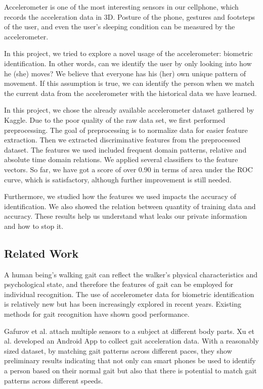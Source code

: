 \documentclass{article} %
\begin{document}
Accelerometer is one of the most interesting sensors in our cellphone, which records the acceleration data in 3D. Posture of the phone, gestures and footsteps of the user, and even the user's sleeping condition can be measured by the accelerometer.

In this project, we tried to explore a novel usage of the accelerometer: biometric identification. In other words, can we identify the user by only looking into how he (she) moves? We believe that everyone has his (her) own unique pattern of movement. If this assumption is true, we can identify the person when we match the current data from the accelerometer with the historical data we have learned. 

In this project, we chose the already available accelerometer dataset gathered by Kaggle. Due to the poor quality of the raw data set, we first performed preprocessing. The goal of preprocessing is to normalize data for easier feature extraction. Then we extracted discriminative features from the preprocessed dataset. The features we used included frequent domain patterns, relative and absolute time domain relations. We applied several classifiers to the feature vectors. So far, we have got a score of over 0.90 in terms of area under the ROC curve, which is satisfactory, although further improvement is still needed.

Furthermore, we studied how the features we used impacts the accuracy of identification. We also showed the relation between quantity of training data and accuracy. These results help us understand what leaks our private information and how to stop it.






\subsection{Related Work} 

A human being's walking gait can reflect the walker's physical characteristics and psychological state, and therefore the features of gait can be employed for individual recognition. The use of accelerometer data for biometric identification is relatively new but has been increasingly explored in recent years. Existing methods for gait recognition have shown good performance.
 
Gafurov et al. \cite{Gafurov:AIAT2007} attach multiple sensors to a subject at different body parts. Xu et al. \cite{Xu:ICB2012} developed an Android App to collect gait acceleration data. With a reasonably sized dataset, by matching gait patterns across different paces, they show preliminary results indicating that not only can smart phones be used to identify a person based on their normal gait but also that there is potential to match gait patterns across different speeds.
\end{document}
